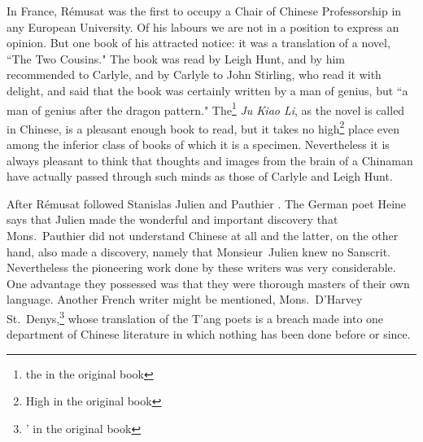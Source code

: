 In France, R\'emusat  was the first to occupy a Chair of Chinese Professorship in any European University.
Of his labours we are not in a position to express an opinion.
But one book of his attracted notice: it was a translation of a novel, ``The Two Cousins."
The book was read by Leigh Hunt, and by him recommended to Carlyle,  and by Carlyle to John Stirling, who read it with delight, and said that the book was certainly written by a man of genius, but ``a man of genius after the dragon pattern."
The\footnote{the in the original book} \emph{Ju Kiao Li}, as the novel is called in Chinese, is a pleasant enough book to read, but it takes no high\footnote{High in the original book} place even among the inferior class of books of which it is a specimen.
Nevertheless it is always pleasant to think that thoughts and images from the brain of a Chinaman have actually passed through such minds as those of Carlyle and Leigh Hunt.

After R\'emusat followed Stanislas Julien  and Pauthier .
The German poet Heine says that Julien made the wonderful and important discovery that Mons.~Pauthier  did not understand Chinese at all and the latter, on the other hand, also made a discovery, namely that Monsieur~Julien knew no Sanscrit. 
Nevertheless the pioneering work done by these writers was very considerable.
One advantage they possessed was that they were thorough masters of their own language.
Another French writer might be mentioned, Mons.~D'Harvey St.~Denys,\footnote{' in the original book}   whose translation of the T'ang poets is a breach made into one department of Chinese literature in which nothing has been done before or since.

